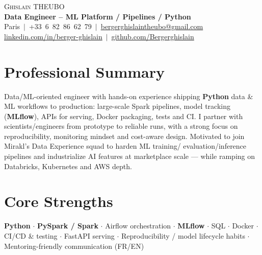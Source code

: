 \documentclass[letterpaper,10.5pt]{article}
\begin{document}
\begin{center}
{\Huge \scshape Ghislain THEUBO}\\[3pt]
\textbf{Data Engineer -- ML Platform / Pipelines / Python}\\[3pt]
\small Paris $\,|\,$ +33~6~82~86~62~79 $\,|\,$ \href{mailto:bergerghislaintheubo@gmail.com}{bergerghislaintheubo@gmail.com}\\[1pt]
\href{https://www.linkedin.com/in/berger-ghislain}{linkedin.com/in/berger-ghislain} $\,|\,$ \href{https://github.com/Bergerghislain}{github.com/Bergerghislain}
\end{center}

\section{Professional Summary}
\small{
Data/ML-oriented engineer with hands-on experience shipping \textbf{Python} data \& ML workflows to production:
large-scale Spark pipelines, model tracking (\textbf{MLflow}), APIs for serving, Docker packaging, tests and CI.
I partner with scientists/engineers from prototype to reliable runs, with a strong focus on reproducibility,
monitoring mindset and cost-aware design. Motivated to join Mirakl's Data Experience squad to harden ML training/
evaluation/inference pipelines and industrialize AI features at marketplace scale --- while ramping on Databricks,
Kubernetes and AWS depth.
}

\section{Core Strengths}
\small{
\textbf{Python} $\cdot$ \textbf{PySpark / Spark} $\cdot$ Airflow orchestration $\cdot$ \textbf{MLflow} $\cdot$
SQL $\cdot$ Docker $\cdot$ CI/CD \& testing $\cdot$ FastAPI serving $\cdot$
Reproducibility / model lifecycle habits $\cdot$ Mentoring-friendly communication (FR/EN)
}
\end{document}
